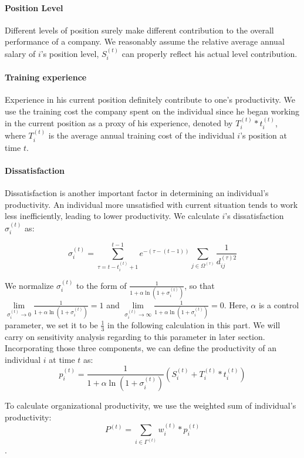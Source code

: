 \documentclass[tcn = 37075, sheet = true, abstract = true]{mcmthesis}
\begin{document}
\paragraph{Position Level}
Different levels of position surely make different contribution to the overall performance of a company. We reasonably assume the relative average annual salary of $i$'s position level, $S_i^{(t)}$ can properly reflect his actual level contribution.

\paragraph{Training experience}
Experience in his current position definitely contribute to one's productivity. We use the training cost the company spent on the individual since he began working in the current position as a proxy of his experience, denoted by $T_i^{(t)}*t_i^{(t)}$, where $T_i^{(t)}$ is the average annual training cost of the individual $i$'s position at time $t$.

\paragraph{Dissatisfaction}
Dissatisfaction is another important factor in determining an individual's productivity. An individual more unsatisfied with current situation tends to work less inefficiently, leading to lower productivity. We calculate $i$'s dissatisfaction $\sigma_i^{(t)}$ as:

$$\displaystyle \sigma_i^{(t)}=\sum_{\tau=t-t_i^{(t)}+1}^{t-1}e^{-(\tau-(t-1))}\sum_{j\in \Omega^{(\tau)}}\frac{1}{d_{ij}^{(\tau)2}}$$

We normalize $\sigma_i^{(t)}$ to the form of $\displaystyle \frac{1}{1+\alpha\ln{(1+\sigma_i^{(t)})}}$, so that $\lim\limits_{\sigma_i^{(t)}\rightarrow 0} \displaystyle \frac{1}{1+\alpha\ln{(1+\sigma_i^{(t)})}}=1$ and $\lim\limits_{\sigma_i^{(t)}\rightarrow \infty} \displaystyle \frac{1}{1+\alpha\ln{(1+\sigma_i^{(t)})}}=0$. Here, $\alpha$ is a control parameter, we set it to be $\displaystyle \frac{1}{3}$ in the following calculation in this part. We will carry on sensitivity analysis regarding to this parameter in later section.\\

Incorporating those three components, we can define the productivity of an individual $i$ at time $t$ as:
$$\displaystyle p_i^{(t)}=\frac{1}{1+\alpha\ln{(1+\sigma_i^{(t)})}}(S_i^{(t)}+T_i^{(t)}*t_i^{(t)})$$

To calculate organizational productivity, we use the weighted sum of individual's productivity: 
$$P^{(t)}=\sum\limits_{i\in\Gamma^{(t)}} w_i^{(t)}*p_i^{(t)}$$.
\end{document}

